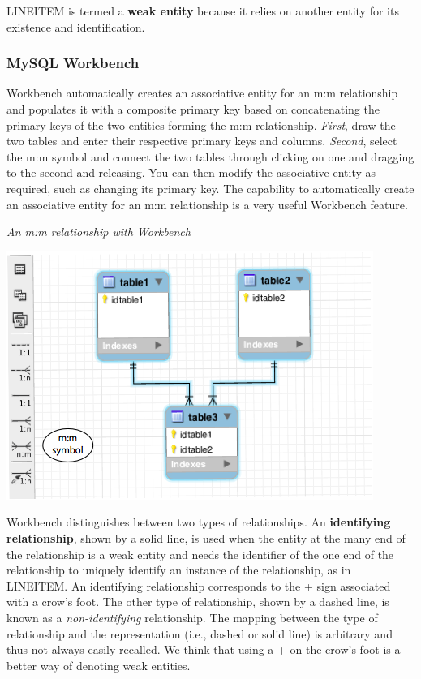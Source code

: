 \documentclass[
]{article}
\begin{document}
LINEITEM is termed a \textbf{weak entity} because it relies on another entity for its existence and identification.

\hypertarget{mysql-workbench-1}{%
\subsubsection*{MySQL Workbench}\label{mysql-workbench-1}}

Workbench automatically creates an associative entity for an m:m relationship and populates it with a composite primary key based on concatenating the primary keys of the two entities forming the m:m relationship. \emph{First}, draw the two tables and enter their respective primary keys and columns. \emph{Second}, select the m:m symbol and connect the two tables through clicking on one and dragging to the second and releasing. You can then modify the associative entity as required, such as changing its primary key. The capability to automatically create an associative entity for an m:m relationship is a very useful Workbench feature.

\emph{An m:m relationship with Workbench}

\includegraphics{Figures/Chapter 5/m-m-wb.png}

Workbench distinguishes between two types of relationships. An \textbf{identifying relationship}, shown by a solid line, is used when the entity at the many end of the relationship is a weak entity and needs the identifier of the one end of the relationship to uniquely identify an instance of the relationship, as in LINEITEM. An identifying relationship corresponds to the + sign associated with a crow's foot. The other type of relationship, shown by a dashed line, is known as a \emph{non-identifying} relationship. The mapping between the type of relationship and the representation (i.e., dashed or solid line) is arbitrary and thus not always easily recalled. We think that using a + on the crow's foot is a better way of denoting weak entities.
\end{document}
